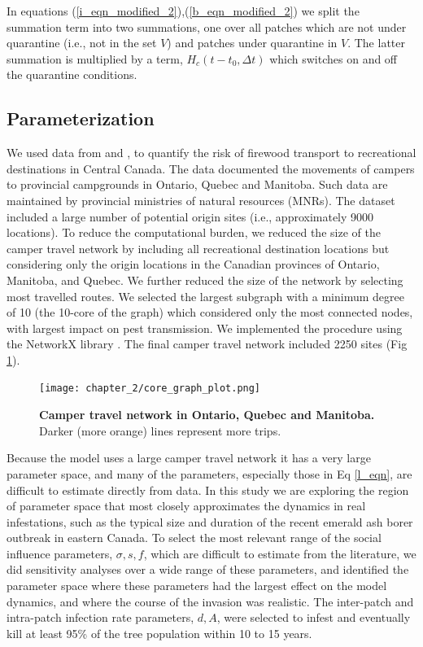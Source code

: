 In equations (\ref{i_eqn_modified_2}),(\ref{b_eqn_modified_2}) we split the summation term into two summations, one over all patches which are not under quarantine (i.e., not in the set $V$) and patches under quarantine in $V$. The latter summation is multiplied by a term, $H_c(t - t_0,\Delta t)$ which switches on and off the quarantine conditions.
\subsection{Parameterization \label{param_section}}
We used data from \cite{koch2014using} and \cite{yemshanov2015optimal}, to quantify the risk of firewood transport to recreational destinations in Central Canada. The data documented the movements of campers to provincial campgrounds in Ontario, Quebec and Manitoba. Such data are maintained by provincial ministries of natural resources (MNRs). The dataset included a large number of potential origin sites (i.e., approximately 9000 locations). To reduce the computational burden, we reduced the size of the camper travel network by including all recreational destination locations but considering only the origin locations in the Canadian provinces of Ontario, Manitoba, and Quebec. We further reduced the size of the network by selecting most travelled routes. We selected the largest subgraph with a minimum degree of 10 (the 10-core of the graph) which considered only the most connected nodes, with largest impact on pest transmission. We implemented the procedure using the NetworkX library \cite{hagberg2008exploring}. The final camper travel network included 2250 sites (Fig \ref{coregraph}).



\begin{figure}[!h]
\centering
\texttt{[image: chapter\_2/core\_graph\_plot.png]}
\caption{\textbf{Camper travel network in Ontario, Quebec and Manitoba.} Darker (more orange) lines represent more trips.}
\label{coregraph}
\end{figure}


Because the model uses a large camper travel network it has a very large parameter space, and many of the parameters, especially those in Eq \ref{l_eqn}, are difficult to estimate directly from data. In this study we are exploring the region of parameter space that most closely approximates the dynamics in real infestations, such as the typical size and duration of the recent emerald ash borer outbreak in eastern Canada. To select the most relevant range of the social influence parameters, $\sigma, s, f$, which are difficult to estimate from the literature, we did sensitivity analyses over a wide range of these parameters, and identified the parameter space where these parameters had the largest effect on the model dynamics, and where the course of the invasion was realistic. The inter-patch and intra-patch infection rate parameters, $d, A$, were selected to infest and eventually kill at least 95\% of the tree population within 10 to 15 years.

